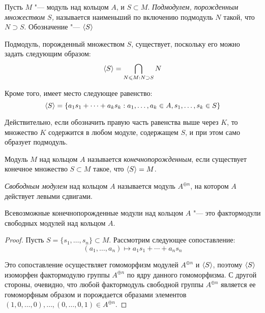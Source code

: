 \begin{definition}
	Пусть $M$ "--- модуль над кольцом $A$, и $S \subset M$. \textit{Подмодулем, порожденным множеством $S$,} называется наименьший по включению подмодуль $N$ такой, что $N \supset S$. Обозначение "--- $\langle S \rangle$
\end{definition}

\begin{note}
	Подмодуль, порожденный множеством $S$, существует, поскольку его можно задать следующим образом:
	\[\langle S \rangle = \bigcap_{N \leqslant M : N \supset S}N\]
	
	Кроме того, имеет место следующее равенство:
	\[\langle S \rangle = \{a_1s_1 + \dotsb + a_ks_k : a_1, \dotsc, a_k \in A, s_1, \dotsc, s_k \in S\}\]
	
	Действительно, если обозначить правую часть равенства выше через $K$, то множество $K$ содержится в любом модуле, содержащем $S$, и при этом само образует подмодуль.
\end{note}

\begin{definition}
	Модуль $M$ над кольцом $A$ называется \textit{конечнопорожденным}, если существует конечное множество $S \subset M$ такое, что $\langle S \rangle = M$.
\end{definition}

\begin{definition}
	\textit{Свободным модулем} над кольцом $A$ называется модуль $A^{\oplus n}$, на котором $A$ действует левыми сдвигами.
\end{definition}

\begin{proposition}
	Всевозможные конечнопорожденные модули над кольцом $A$ "--- это фактормодули свободных модулей над кольцом $A$.
\end{proposition}

\begin{proof}
	Пусть $S = \{s_1, \dotsc, s_n\} \subset M$. Рассмотрим следующее сопоставление:
	\[(a_1, \dotsc, a_n) \mapsto a_1s_1 + \dotsb + a_ns_n\]
	
	Это сопоставление осуществляет гомоморфизм модулей $A^{\oplus n}$ и $\langle S \rangle$, поэтому $\langle S \rangle$ изоморфен фактормодулю группы $A^{\oplus n}$ по ядру данного гомоморфизма. С другой стороны, очевидно, что любой фактормодуль свободной группы $A^{\oplus n}$ является ее гомоморфным образом и порождается образами элементов $(1, 0, \dotsc, 0), \dotsc, (0, \dotsc, 0, 1) \in A^{\oplus n}$.
\end{proof}
